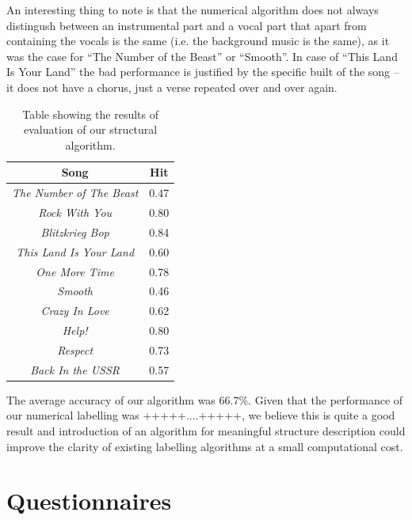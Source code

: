 An interesting thing to note is that the numerical algorithm does not always distingush between an instrumental part and a vocal part that apart from containing the vocals is the same (i.e. the background music is the same), as it was the case for ``The Number of the Beast'' or ``Smooth''. In case of ``This Land Is Your Land'' the bad performance is justified by the specific built of the song -- it does not have a chorus, just a verse repeated over and over again. 

\begin{table}
\begin{center}
\begin{tabular}{| c | c |} \hline 
Song  											&  Hit		\\ \hline \hline
\textit{The Number of The Beast} 	&  0.47	\\ \hline
\textit{Rock With You}						&	0.80	\\ \hline
\textit{Blitzkrieg Bop} 						&	0.84	\\ \hline
\textit{This Land Is Your Land} 		&	0.60	\\ \hline
\textit{One More Time}					&	0.78	\\ \hline
\textit{Smooth}								&	0.46	\\ \hline
\textit{Crazy In Love}						&	0.62	\\ \hline
\textit{Help!}									&	0.80	\\ \hline
\textit{Respect}								&	0.73	\\ \hline
\textit{Back In the USSR}				&	0.57	\\ \hline

\end{tabular}
\caption{Table showing the results of evaluation of our structural algorithm.}
\label{table:labelresults}
\end{center}
\end{table}

The average accuracy of our algorithm was 66.7\%. Given that the performance of our numerical labelling was +++++....+++++, we believe this is quite a good result and introduction of an algorithm for meaningful structure description could improve the clarity of existing labelling algorithms at a small computational cost. 


\vspace{20pt}

\section{Questionnaires}

